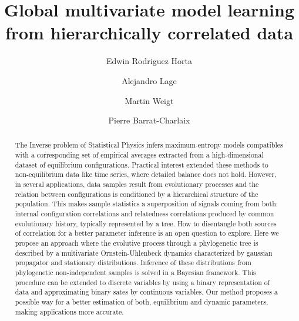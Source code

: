\documentclass[preprint,amsmath,amssymb,superscriptaddress,showpacs,pre]{revtex4-1}
\begin{document}
\title{Global multivariate model learning from hierarchically correlated data}

\author{Edwin Rodriguez Horta} 
%
\author{Alejandro Lage} 
%
\author{Martin Weigt} 
% 

\author{Pierre Barrat-Charlaix} 




\begin{abstract}
	The Inverse problem of Statistical Physics infers maximum-entropy  models  compatibles with a corresponding set of empirical averages extracted from a high-dimensional dataset of equilibrium configurations. Practical interest extended these methods to non-equilibrium data  like  time series, where detailed balance does not hold. However, in several applications, data samples  result from evolutionary processes and the relation between configurations is conditioned by a hierarchical structure of the population. This makes sample statistics a superposition of  signals coming from both: internal configuration correlations and relatedness correlations produced by common evolutionary  history, typically represented by a tree. How to disentangle both sources of correlation for a better parameter inference is an open question to explore. Here we propose an approach  where the  evolutive process through a phylogenetic tree is described by  a  multivariate Ornstein-Uhlenbeck dynamics characterized by  gaussian propagator and stationary distributions. Inference of these distributions from  phylogenetic non-independent samples is solved in a Bayesian framework. This procedure can be  extended to discrete variables by using a binary representation of data and approximating  binary sates by continuous variables. Our method proposes a possible way for  a better estimation of both, equilibrium and dynamic parameters, making  applications more accurate. 
\end{abstract}
\end{document}

